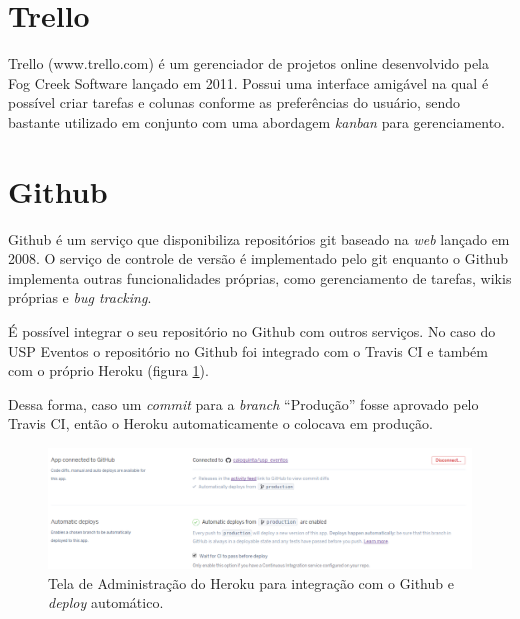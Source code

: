 \section{Trello}
\par Trello (www.trello.com) é um gerenciador de projetos online desenvolvido pela Fog Creek Software lançado em 2011. Possui uma interface amigável na qual é possível criar tarefas e colunas conforme as preferências do usuário, sendo bastante utilizado em conjunto com uma abordagem \emph{kanban} para gerenciamento.

\section{Github}
\par Github é um serviço que disponibiliza repositórios git baseado na \emph{web} lançado em 2008. O serviço de controle de versão é implementado pelo git enquanto o Github implementa outras funcionalidades próprias, como gerenciamento de tarefas, wikis próprias e \emph{bug tracking}.
\par É possível integrar o seu repositório no Github com outros serviços. No caso do USP Eventos o repositório no Github foi integrado com o Travis CI e também com o próprio Heroku (figura \ref{fig:heroku_automatic_deploy}).
\par Dessa forma, caso um \emph{commit} para a \emph{branch} ``Produção'' fosse aprovado pelo Travis CI, então o Heroku automaticamente o colocava em produção.
\begin{figure}[htb]
\centering
\includegraphics[width=15cm]{figuras/heroku_automatic_deploy}
\caption{\label{fig:heroku_automatic_deploy} Tela de Administração do Heroku para integração com o Github e \emph{deploy} automático.}
\end{figure}
